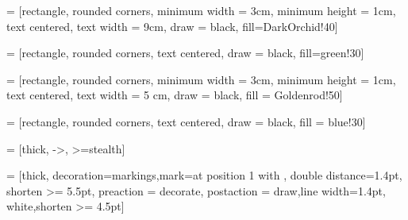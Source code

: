 \makeatletter
\providecommand\barcirc{\mathpalette\@barred\circ}%
\def\@barred#1#2{\ooalign{\hfil$#1-$\hfil\cr\hfil$#1#2$\hfil\cr}}%
\newcommand\stst{^{\protect\barcirc}}%
\makeatother

\makeatletter
\newcommand*{\rom}[1]{\expandafter\@slowromancap\romannumeral #1@}
\makeatother

 = [rectangle, rounded corners, minimum width = 3cm, minimum height = 1cm, text centered, text width = 9cm, draw = black, fill=DarkOrchid!40]

 = [rectangle, rounded corners, text centered, draw = black, fill=green!30]

 = [rectangle, rounded corners, minimum width = 3cm, minimum height = 1cm, text centered, text width = 5 cm, draw = black, fill = Goldenrod!50]

 = [rectangle, rounded corners, text centered, draw = black, fill = blue!30]

 = [thick, ->, >=stealth]

 = [thick, decoration={markings,mark=at position
   1 with {}},
   double distance=1.4pt, shorten >= 5.5pt,
   preaction = {decorate},
   postaction = {draw,line width=1.4pt, white,shorten >= 4.5pt}]



